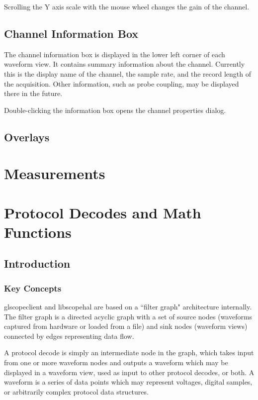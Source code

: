 \documentclass[11pt]{article}
\begin{document}
Scrolling the Y axis scale with the mouse wheel changes the gain of the channel.

\subsection{Channel Information Box}

The channel information box is displayed in the lower left corner of each waveform view. It contains summary
information about the channel. Currently this is the display name of the channel, the sample rate, and the record
length of the acquisition. Other information, such as probe coupling, may be displayed there in the future.

Double-clicking the information box opens the channel properties dialog.

\subsection{Overlays}

\section{Measurements}

\section{Protocol Decodes and Math Functions}

\subsection{Introduction}

\subsubsection{Key Concepts}

glscopeclient and libscopehal are based on a ``filter graph" architecture internally. The filter graph is a directed
acyclic graph with a set of source nodes (waveforms captured from hardware or loaded from a file) and sink nodes
(waveform views) connected by edges representing data flow.

A protocol decode is simply an intermediate node in the graph, which takes input from one or more waveform nodes and
outputs a waveform which may be displayed in a waveform view, used as input to other protocol decodes, or both. A
waveform is a series of data points which may represent voltages, digital samples, or arbitrarily complex protocol data
structures.
\end{document}
